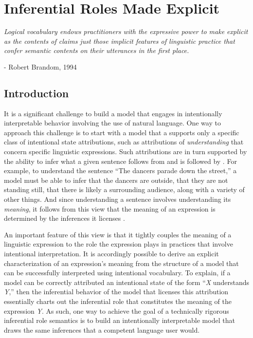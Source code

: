 

\chapter{Inferential Roles Made Explicit}
\renewcommand{\epigraphrule}{0pt}
\setlength{\epigraphwidth}{4.5in}
\epigraph{\textit{Logical vocabulary endows practitioners with the expressive power to make explicit as the contents of claims just those implicit features of linguistic practice that confer semantic contents on their utterances in the first place.}}{- Robert Brandom, 1994}

\section{Introduction}

It is a significant challenge to build a model that engages in intentionally interpretable behavior involving the use of natural language. One way to approach this challenge is to start with a model that a supports only a specific class of intentional state attributions, such as attributions of \textit{understanding} that concern specific linguistic expressions. Such attributions are in turn supported by the ability to infer what a given sentence follows from and is followed by \citep{Brandom:1994}. For example, to understand the sentence ``The dancers parade down the street,'' a model must be able to infer that the dancers are outside, that they are not standing still, that there is likely a surrounding audience, along with a variety of other things. And since understanding a sentence involves understanding its \textit{meaning}, it follows from this view that the meaning of an expression is determined by the inferences it licenses \citep{Brandom:1994,Sellars:1953,Brandom:2000,Brandom:2009}. 

An important feature of this view is that it tightly couples the meaning of a linguistic expression to the role the expression plays in practices that involve intentional interpretation. It is accordingly possible to derive an explicit characterization of an expression's meaning from the structure of a model that can be successfully interpreted using intentional vocabulary. To explain, if a model can be correctly attributed an intentional state of the form ``\textit{X} understands \textit{Y},'' then the inferential behavior of the model that licenses this attribution essentially charts out the inferential role that constitutes the meaning of the expression \textit{Y}. As such, one way to achieve the goal of a technically rigorous inferential role semantics is to build an intentionally interpretable model that draws the same inferences that a competent language user would.

